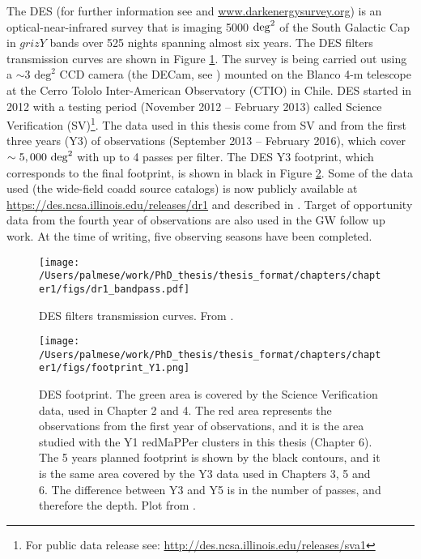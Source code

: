 The DES (for further information see \citealt{descollaboration} and \url{www.darkenergysurvey.org}) is an optical-near-infrared survey that is imaging 5000 ${\rm deg}^2$ of the South Galactic Cap in $grizY$ bands over 525 nights spanning almost six years. The DES filters transmission curves are shown in Figure \ref{fig:filters}. The survey is being carried out using a $\sim3$ $\textrm{deg}^2$ CCD
camera (the DECam, see \citealt{flaugher}) mounted on the Blanco 4-m telescope at the Cerro Tololo Inter-American Observatory (CTIO) in Chile. DES started in 2012 with a testing period (November 2012 -- February 2013) called Science Verification (SV)\footnote{For public data release see: \url{http://des.ncsa.illinois.edu/releases/sva1}}. The data used in this thesis come from SV and from the first three years (Y3) of observations (September 2013 -- February 2016), which cover $\sim5,000~ {\rm deg}^2$ with up to 4 passes per filter. The DES Y3 footprint, which corresponds to the final footprint, is shown in black in Figure \ref{fig:footprint}. Some of the data used (the wide-field coadd source catalogs) is now publicly available at \url{https://des.ncsa.illinois.edu/releases/dr1} and described in \citet{dr1}. Target of opportunity data from the fourth year of observations are also used in the GW follow up work. At the time of writing, five observing seasons have been completed.

\begin{figure}\centering
\texttt{[image: /Users/palmese/work/PhD\_thesis/thesis\_format/chapters/chapter1/figs/dr1\_bandpass.pdf]}
\caption{DES filters transmission curves. From \citet{dr1}.}\label{fig:filters}
\end{figure}
\begin{figure}\centering
\texttt{[image: /Users/palmese/work/PhD\_thesis/thesis\_format/chapters/chapter1/figs/footprint\_Y1.png]}
\caption{DES footprint. The green area is covered by the Science Verification data, used in Chapter 2 and 4. The red area represents the observations from the first year of observations, and it is the area studied with the Y1 redMaPPer clusters in this thesis (Chapter 6). The 5 years planned footprint is shown by the black contours, and it is the same area covered by the Y3 data used in Chapters 3, 5 and 6. The difference between Y3 and Y5 is in the number of passes, and therefore the depth. Plot from \citet{nonDE}.}\label{fig:footprint}
\end{figure}

